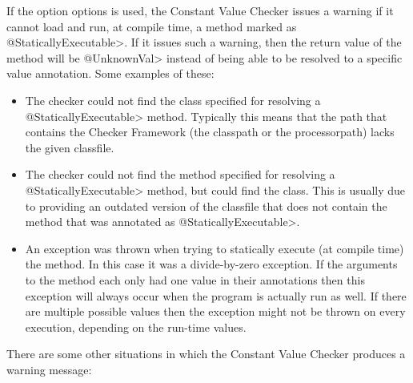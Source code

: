 
If the option  options is used, the Constant Value Checker issues a warning if it cannot load and run, at
compile time, a method marked as \<@StaticallyExecutable>.  If it issues
such a warning, then the return value of the method will be \<@UnknownVal>
instead of being able to be resolved to a specific value annotation.
Some examples of these:

\begin{sloppypar}
\begin{itemize}
\item {}

  The checker could not find the class
  specified for resolving a \<@StaticallyExecutable> method. Typically
  this means that the path that contains the Checker Framework (the
  classpath or the processorpath) lacks the given classfile.

\item {}

  The checker could not find the method  specified for
  resolving a \<@StaticallyExecutable> method, but could find the
  class. This is usually due to providing an outdated version of the
  classfile that does not contain the
  method that was annotated as \<@StaticallyExecutable>.

\item {}

  An exception was thrown when trying to statically execute (at compile time) the
  method. In this case it was a divide-by-zero exception. If the
  arguments to the method each only had one value in their annotations
  then this exception will always occur when the program is actually
  run as well. If there are multiple possible values then the exception
  might not be thrown on every execution, depending on the run-time values.

\end{itemize}
\end{sloppypar}

There are some other situations in which the Constant Value Checker produces a
warning message:

